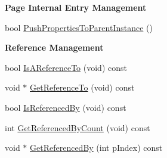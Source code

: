 \begin{Indent}\textbf{ Page Internal Entry Management}\par
\begin{DoxyCompactItemize}
\item 
bool \hyperlink{class_fbx_property_handle_a94d8590ac684a0a0895e399396b79c52}{Push\+Properties\+To\+Parent\+Instance} ()
\end{DoxyCompactItemize}
\end{Indent}
\begin{Indent}\textbf{ Reference Management}\par
\begin{DoxyCompactItemize}
\item 
bool \hyperlink{class_fbx_property_handle_ae33624da8a0ccfd5bb44a5f12f6f0a81}{Is\+A\+Reference\+To} (void) const
\item 
void $\ast$ \hyperlink{class_fbx_property_handle_af9780300940a75d036215b70e67698ac}{Get\+Reference\+To} (void) const
\item 
bool \hyperlink{class_fbx_property_handle_a832e6f2916497d538658f6eddc56dbc7}{Is\+Referenced\+By} (void) const
\item 
int \hyperlink{class_fbx_property_handle_ac5fb2c38abc682f2151960ed4286f3ca}{Get\+Referenced\+By\+Count} (void) const
\item 
void $\ast$ \hyperlink{class_fbx_property_handle_a94151c3aa9e0b6f1881bbec6ca389d0a}{Get\+Referenced\+By} (int p\+Index) const
\end{DoxyCompactItemize}
\end{Indent}
